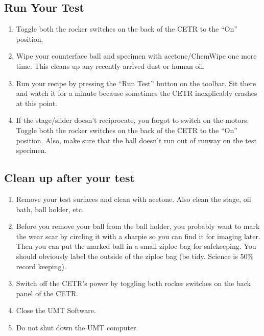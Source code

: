 \documentclass[10pt, letterpaper]{article}
\begin{document}
\subsection{Run Your Test}
\begin{enumerate}
\item Toggle both the rocker switches on the back of the CETR to the ``On'' position.

\item Wipe your counterface ball and specimen with acetone/ChemWipe one more time. This cleans up any recently arrived dust or human oil. 

\item Run your recipe by pressing the ``Run Test'' button on the toolbar. Sit there and watch it for a minute because sometimes the CETR inexplicably crashes at this point. 

\item If the stage/slider doesn't reciprocate, you forgot to switch on the motors. Toggle both the rocker switches on the back of the CETR to the ``On'' position. Also, make sure that the ball doesn't run out of runway on the test specimen.
\end{enumerate}

\subsection{Clean up after your test}
\begin{enumerate}
\item Remove your test surfaces and clean with acetone. Also clean the stage, oil bath, ball holder, etc.
\item Before you remove your ball from the ball holder, you probably want to mark the wear scar by circling it with a sharpie so you can find it for imaging later. Then you can put the marked ball in a small ziploc bag for safekeeping. You should obviously label the outside of the ziploc bag (be tidy. Science is 50\% record keeping).
\item Switch off the CETR's power by toggling both rocker switches on the back panel of the CETR.
\item Close the UMT Software.
\item Do not shut down the UMT computer.
\end{enumerate}
\end{document}
